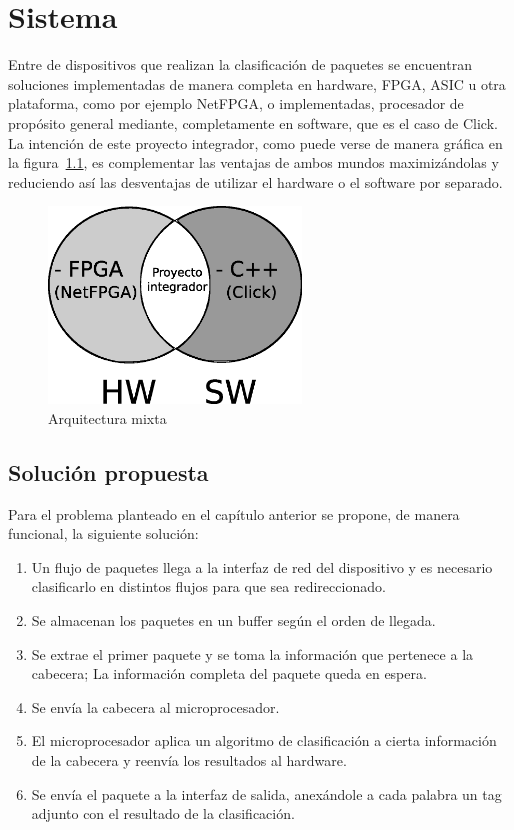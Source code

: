 \chapter{Sistema}

Entre de dispositivos que realizan la clasificación de paquetes se encuentran soluciones implementadas de manera completa en hardware, FPGA, ASIC u otra plataforma, como por ejemplo NetFPGA\cite{netfpga}, o implementadas, procesador de propósito general mediante, completamente en software, que es el caso de Click\cite{click}. La intención de este proyecto integrador, como puede verse de manera gráfica en la figura~\ref{fig:hwsw}, es complementar las ventajas de ambos mundos maximizándolas y reduciendo así las desventajas de utilizar el hardware o el software por separado. 


 \begin{figure}[h]
  \centering
	 \includegraphics[width=0.6\textwidth]{2-sistema/graf/interseccion.eps}
  \caption{Arquitectura mixta}
  \label{fig:hwsw}
\end{figure}


\section{Solución propuesta}

Para el problema planteado en el capítulo anterior se propone, de manera funcional, la siguiente solución: 

    \begin{enumerate}
  	\item Un flujo de paquetes llega a la interfaz de red del dispositivo y es necesario clasificarlo en distintos flujos para que sea redireccionado.
	\item Se almacenan los paquetes en un buffer según el orden de llegada.
	\item Se extrae el primer paquete y se toma la información que pertenece a la cabecera; La información completa del paquete queda en espera.
	\item Se envía la cabecera al microprocesador.
	\item El microprocesador aplica un algoritmo de clasificación a cierta información de la cabecera y reenvía los resultados al hardware. 
	\item Se envía el paquete a la interfaz de salida, anexándole a cada palabra un tag adjunto con el resultado de la clasificación.
    \end{enumerate}

